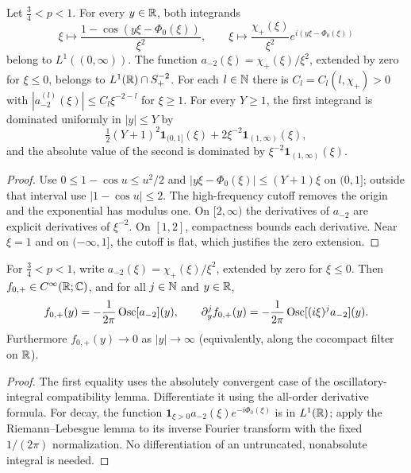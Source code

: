 \begin{lemma}
  \label{lem:c04_seed_integrable}
  Let $\frac34<p<1$. For every $y\in\mathbb{R}$, both integrands
  \[
    \xi\longmapsto\frac{1-\cos(y\xi-\Phi_0(\xi))}{\xi^2},\qquad
    \xi\longmapsto\frac{\chi_+(\xi)}{\xi^2}e^{i(y\xi-\Phi_0(\xi))}
  \]
  belong to $L^1((0,\infty))$.
  The function $a_{-2}(\xi)=\chi_+(\xi)/\xi^2$, extended by zero for $\xi\le0$,
  belongs to $L^1(\mathbb{R})\cap S^{-2}_+$.
  For each $l\in\mathbb{N}$ there is $C_l=C_l(l,\chi_+)>0$ with
  $|a_{-2}^{(l)}(\xi)|\le C_l\xi^{-2-l}$ for $\xi\ge1$.
  For every $Y\ge1$, the first integrand is dominated uniformly in $|y|\le Y$ by
  \[
    \tfrac12(Y+1)^2\mathbf1_{(0,1]}(\xi)+2\xi^{-2}\mathbf1_{(1,\infty)}(\xi),
  \]
  and the absolute value of the second is dominated by
  $\xi^{-2}\mathbf1_{(1,\infty)}(\xi)$.
\end{lemma}
\begin{proof}
  Use $0\le1-\cos u\le u^2/2$ and
  $|y\xi-\Phi_0(\xi)|\le(Y+1)\xi$ on $(0,1]$; outside that interval use
  $|1-\cos u|\le2$. The high-frequency cutoff removes the origin and the
  exponential has modulus one. On $[2,\infty)$ the derivatives of $a_{-2}$ are
  explicit derivatives of $\xi^{-2}$. On $[1,2]$, compactness bounds each derivative.
  Near $\xi=1$ and on $(-\infty,1]$, the cutoff is flat, which justifies the zero extension.
\end{proof}

\begin{lemma}
  \label{lem:c04_seed_high_regular}
  For $\frac34<p<1$, write $a_{-2}(\xi)=\chi_+(\xi)/\xi^2$, extended by zero for $\xi\le0$.
  Then $f_{0,+}\in C^\infty(\mathbb{R};\mathbb{C})$, and for all $j\in\mathbb{N}$ and $y\in\mathbb{R}$,
  \[
    f_{0,+}(y)=-\frac1{2\pi}\operatorname{Osc}[a_{-2}](y),\qquad
    \partial_y^jf_{0,+}(y)=-\frac1{2\pi}\operatorname{Osc}[(i\xi)^ja_{-2}](y).
  \]
  Furthermore $f_{0,+}(y)\to0$ as $|y|\to\infty$ (equivalently, along the cocompact
  filter on $\mathbb{R}$).
\end{lemma}
\begin{proof}
  The first equality uses the absolutely convergent case of the oscillatory-integral
  compatibility lemma. Differentiate it using the all-order derivative formula.
  For decay, the function $\mathbf1_{\xi>0}a_{-2}(\xi)e^{-i\Phi_0(\xi)}$ is in $L^1(\mathbb{R})$;
  apply the Riemann--Lebesgue lemma to its inverse Fourier transform with the fixed
  $1/(2\pi)$ normalization. No differentiation of an untruncated, nonabsolute integral is needed.
\end{proof}

